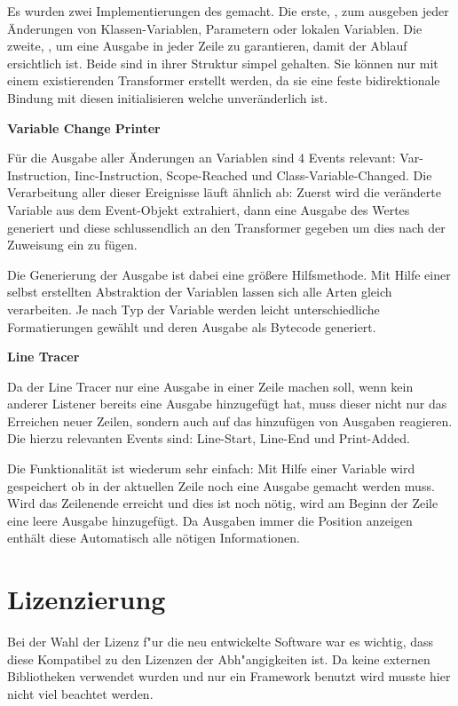 Es wurden zwei Implementierungen des  gemacht. Die erste, , zum ausgeben jeder Änderungen von Klassen-Variablen, Parametern oder lokalen Variablen. Die zweite, , um eine Ausgabe in jeder Zeile zu garantieren, damit der Ablauf ersichtlich ist. Beide sind in ihrer Struktur simpel gehalten. Sie können nur mit einem existierenden Transformer erstellt werden, da sie eine feste bidirektionale Bindung mit diesen initialisieren welche unveränderlich ist.

\textbf{Variable Change Printer}

Für die Ausgabe aller Änderungen an Variablen sind 4 Events relevant: Var-Instruction, Iinc-Instruction, Scope-Reached und Class-Variable-Changed. Die Verarbeitung aller dieser Ereignisse läuft ähnlich ab: Zuerst wird die veränderte Variable aus dem Event-Objekt extrahiert, dann eine Ausgabe des Wertes generiert und diese schlussendlich an den Transformer gegeben um dies nach der Zuweisung ein zu fügen.

Die Generierung der Ausgabe ist dabei eine größere Hilfsmethode. Mit Hilfe einer selbst erstellten Abstraktion der Variablen lassen sich alle Arten gleich verarbeiten. Je nach Typ der Variable werden leicht unterschiedliche Formatierungen gewählt und deren Ausgabe als Bytecode generiert.

\textbf{Line Tracer}

Da der Line Tracer nur eine Ausgabe in einer Zeile machen soll, wenn kein anderer Listener bereits eine Ausgabe hinzugefügt hat, muss dieser nicht nur das Erreichen neuer Zeilen, sondern auch auf das hinzufügen von Ausgaben reagieren. Die hierzu relevanten Events sind: Line-Start, Line-End und Print-Added.

Die Funktionalität ist wiederum sehr einfach: Mit Hilfe einer Variable wird gespeichert ob in der aktuellen Zeile noch eine Ausgabe gemacht werden muss. Wird das Zeilenende erreicht und dies ist noch nötig, wird am Beginn der Zeile eine leere Ausgabe hinzugefügt. Da Ausgaben immer die Position anzeigen enthält diese Automatisch alle nötigen Informationen.

\section{Lizenzierung} 

Bei der Wahl der Lizenz f"ur die neu entwickelte Software war es wichtig, dass diese Kompatibel zu den Lizenzen der Abh"angigkeiten ist. Da keine externen Bibliotheken verwendet wurden und nur ein Framework benutzt wird musste hier nicht viel beachtet werden.


